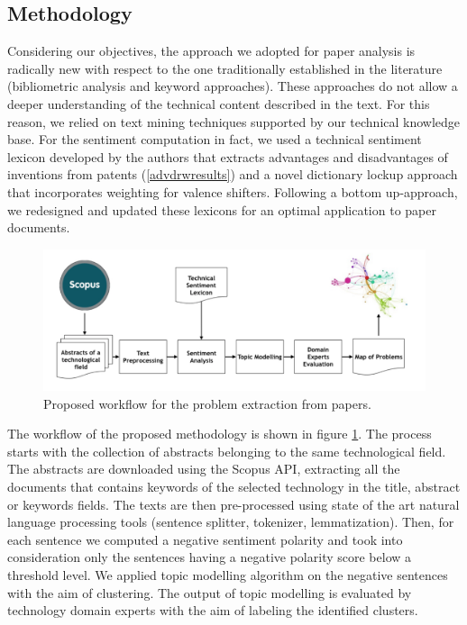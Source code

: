 \documentclass[]{book}
\theoremstyle{definition}
\theoremstyle{definition}
\theoremstyle{definition}
\theoremstyle{remark}
\begin{document}
\subsection{Methodology}\label{methodology-4}

Considering our objectives, the approach we adopted for paper analysis
is radically new with respect to the one traditionally established in
the literature (bibliometric analysis and keyword approaches). These
approaches do not allow a deeper understanding of the technical content
described in the text. For this reason, we relied on text mining
techniques supported by our technical knowledge base. For the sentiment
computation in fact, we used a technical sentiment lexicon developed by
the authors that extracts advantages and disadvantages of inventions
from patents (\ref{advdrwresults}) and a novel dictionary lockup
approach that incorporates weighting for valence shifters. Following a
bottom up-approach, we redesigned and updated these lexicons for an
optimal application to paper documents.

\begin{figure}

{\centering \includegraphics[width=0.8\linewidth]{_bookdown_files/figures/bcworkflow} 

}

\caption{Proposed workflow for the problem extraction from papers. }\label{fig:bcworkflow}
\end{figure}

The workflow of the proposed methodology is shown in figure
\ref{fig:bcworkflow}. The process starts with the collection of
abstracts belonging to the same technological field. The abstracts are
downloaded using the Scopus API, extracting all the documents that
contains keywords of the selected technology in the title, abstract or
keywords fields. The texts are then pre-processed using state of the art
natural language processing tools (sentence splitter, tokenizer,
lemmatization). Then, for each sentence we computed a negative sentiment
polarity and took into consideration only the sentences having a
negative polarity score below a threshold level. We applied topic
modelling algorithm on the negative sentences with the aim of
clustering. The output of topic modelling is evaluated by technology
domain experts with the aim of labeling the identified clusters.
\end{document}
